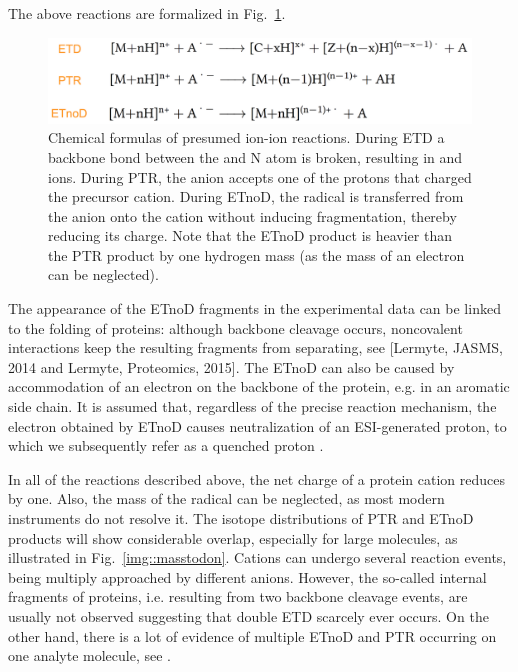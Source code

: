 \documentclass{llncs}
\begin{document}
        The above reactions are formalized in Fig.~\ref{img::reactions}.
        \begin{figure}[h]
                \center
                \includegraphics[width=.8\textwidth]{reactions.png}
                \caption{Chemical formulas of presumed ion-ion reactions. During ETD a backbone bond between the  and N atom is broken, resulting in  and  ions. During PTR, the anion accepts one of the protons that charged the precursor cation. During ETnoD, the radical is transferred from the anion onto the cation without inducing fragmentation, thereby reducing its charge. Note that the ETnoD product is heavier than the PTR product by one hydrogen mass (as the mass of an electron can be neglected).}\label{img::reactions}
        \end{figure}

        The appearance of the ETnoD fragments in the experimental data can be linked to the folding of proteins: although backbone cleavage occurs, noncovalent interactions keep the resulting fragments from separating, see \cite{Lermyte2014-vu,Lermyte2015-oy} [Lermyte, JASMS, 2014 and Lermyte, Proteomics, 2015]. The ETnoD can also be caused by accommodation of an electron on the backbone of the protein, e.g. in an aromatic side chain. It is assumed that, regardless of the precise reaction mechanism, the electron obtained by ETnoD causes neutralization of an ESI-generated proton, to which we subsequently refer as a quenched proton \cite{Lermyte2015-lm}.

        In all of the reactions described above, the net charge of a protein cation reduces by one. Also, the mass of the radical can be neglected, as most modern instruments do not resolve it. The isotope distributions of PTR and ETnoD products will show considerable overlap, especially for large molecules, as illustrated in Fig.~\ref{img::masstodon}. Cations can undergo several reaction events, being multiply approached by different anions. However, the so-called internal fragments of proteins, i.e. resulting from two backbone cleavage events, are usually not observed suggesting that double ETD scarcely ever occurs. On the other hand, there is a lot of evidence of multiple ETnoD and PTR occurring on one analyte molecule, see \cite{Lermyte2015-li}.
\end{document}
